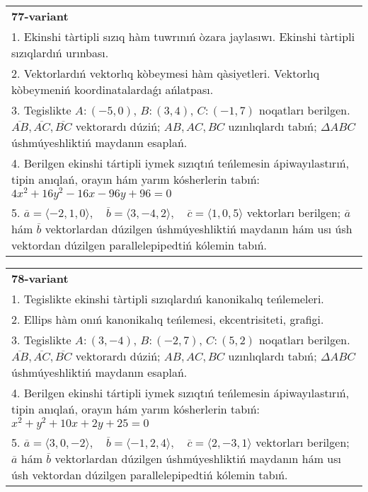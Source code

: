 \documentclass{article}
\begin{document}
\begin{tabular}{m{17cm}}
\textbf{77-variant}\\
1. Ekinshi tàrtipli sızıq hàm tuwrınıń òzara jaylasıwı. Ekinshi tàrtipli sızıqlardıń urınbası.\\

2. Vektorlardıń vektorlıq kòbeymesi hàm qàsiyetleri. Vektorlıq kòbeymeniń koordinatalardaǵı ańlatpası. \\

3. Tegislikte $A: (-5, 0)$, $B: (3, 4)$, $C: (-1, 7)$ noqatları berilgen. $\overline{AB}, \overline{AC}, \overline{BC}$ vektorardı dúziń; $AB, AC, BC$ uzınlıqlardı tabıń; $\Delta ABC$ úshmúyeshliktiń maydanın esaplań. \\

4. Berilgen ekinshi tártipli iymek sızıqtıń teńlemesin ápiwayılastırıń, tipin anıqlań, orayın hám yarım kósherlerin tabıń: $4x^2+16y^2-16x-96y+96=0$\\

5. \(\overline{a} = \langle -2, 1, 0 \rangle, \quad \overline{b} = \langle 3, -4, 2 \rangle, \quad \overline{c} = \langle 1, 0, 5 \rangle\) vektorları berilgen; \(\overline{a}\) hám \(\overline{b}\) vektorlardan dúzilgen úshmúyeshliktiń maydanın hám usı úsh vektordan dúzilgen parallelepipedtiń kólemin tabıń.
\end{tabular}
\vspace{1cm}


\begin{tabular}{m{17cm}}
\textbf{78-variant}\\
1. Tegislikte ekinshi tàrtipli sızıqlardıń kanonikalıq teńlemeleri.\\

2. Ellips hàm onıń kanonikalıq teńlemesi, ekcentrisiteti, grafigi.\\

3. Tegislikte $A: (3, -4)$, $B: (-2, 7)$, $C: (5, 2)$ noqatları berilgen. $\overline{AB}, \overline{AC}, \overline{BC}$ vektorardı dúziń; $AB, AC, BC$ uzınlıqlardı tabıń; $\Delta ABC$ úshmúyeshliktiń maydanın esaplań. \\

4. Berilgen ekinshi tártipli iymek sızıqtıń teńlemesin ápiwayılastırıń, tipin anıqlań, orayın hám yarım kósherlerin tabıń: $x^2+y^2+10x+2y+25=0$\\

5. \(\overline{a} = \langle 3, 0, -2 \rangle, \quad \overline{b} = \langle -1, 2, 4 \rangle, \quad \overline{c} = \langle 2, -3, 1 \rangle\) vektorları berilgen; \(\overline{a}\) hám \(\overline{b}\) vektorlardan dúzilgen úshmúyeshliktiń maydanın hám usı úsh vektordan dúzilgen parallelepipedtiń kólemin tabıń.
\end{tabular}
\vspace{1cm}
\end{document}
